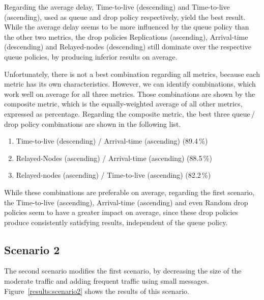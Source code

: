 \documentclass[conference,10pt,letterpaper,final]{IEEEtran}
\begin{document}
Regarding the average delay, Time-to-live (descending) and Time-to-live (ascending), used as queue and drop policy respectively, yield the best result.
While the average delay seems to be more influenced by the queue policy than the other two metrics, the drop policies Replications (ascending), Arrival-time (descending) and Relayed-nodes (descending) still dominate over the respective queue policies, by producing inferior results on average. 


Unfortunately, there is not a best combination regarding all metrics, because each metric has its own characteristics.
However, we can identify combinations, which work well on average for all three metrics.
Those combinations are shown by the composite metric, which is the equally-weighted average of all other metrics, expressed as percentage.
Regarding the composite metric, the best three queue\,/\,drop policy combinations are shown in the following list.

\begin{enumerate}
 \item Time-to-live (descending) / Arrival-time (ascending) (89.4\,\%)
 \vspace{0.1cm}
 \item Relayed-Nodes (ascending) / Arrival-time (ascending) (88.5\,\%)
 \vspace{0.1cm}
 \item Relayed-nodes (ascending) / Time-to-live (ascending) (82.2\,\%)
 \vspace{0.1cm}
\end{enumerate}

While these combinations are preferable on average, regarding the first scenario, the Time-to-live (ascending), Arrival-time (ascending) and even Random drop policies seem to have a greater impact on average, since these drop policies produce consistently satisfying results, independent of the queue policy.


\subsection{Scenario 2}
\label{subsec:evaluation:scenario2}
The second scenario modifies the first scenario, by decreasing the size of the moderate traffic and adding frequent traffic using small messages.
Figure~\ref{results:scenario2} shows the results of this scenario.
\end{document}
